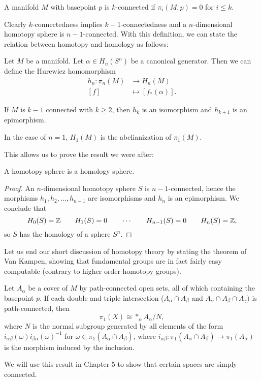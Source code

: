\begin{definition}[$k$-connected]
    A manifold $M$ with basepoint $p$ is $k$-connected if  $\pi_i(M, p) = 0$ for  $i \le  k$.
\end{definition}
Clearly $k$-connectedness implies  $k-1$-connectedness and a $n$-dimensional homotopy sphere is $n-1$-connected.
With this definition, we can state the relation between homotopy and homology as follows:
\begin{theorem}
    Let $M$ be a manifold.
    Let $\alpha \in H_n(S^{n})$ be a canonical generator.
    Then we can define the Hurewicz homomorphism
    \begin{align*}
        h_n: \pi_n(M) &\longrightarrow H_n(M) \\
        [f] &\longmapsto [f_*(\alpha)]
    .\end{align*}

    If $M$ is  $k-1$ connected with  $k\ge 2$, then $h_k$ is an isomorphism and $h_{k+1}$ is an epimorphism.
\end{theorem}
\begin{remark}
    In the case of $n=1$, $H_1(M)$ is the abelianization of $\pi_1(M)$.
\end{remark}
This allows us to prove the result we were after:
\begin{prop}
    A homotopy sphere is a homology sphere.
\end{prop}
\begin{proof}
    An $n$-dimensional homotopy sphere $S$ is $n-1$-connected, hence the morphisms $h_1, h_2, \ldots, h_{n-1}$ are isomorphisms and $h_n$ is an epimorphism.
    We conclude that 
    \[
        H_0(S) = \mathbb{Z} \qquad
        H_1(S) = 0 \qquad 
        \cdots \qquad
        H_{n-1}(S) = 0 \qquad 
        H_{n}(S) = \mathbb{Z}
    ,\] 
    so $S$ has the homology of a sphere  $S^{n}$.
\end{proof}

Let us end our short discussion of homotopy theory by stating the theorem of Van Kampen, showing that fundamental groups are in fact fairly easy computable (contrary to higher order homotopy groups).
\begin{theorem}
    Let $A_\alpha$ be a cover of $M$ by path-connected open sets, all of which containing the basepoint $p$.
    If each double and triple intersection ($A_\alpha \cap A_\beta$ and $A_\alpha \cap A_\beta \cap A_\gamma)$ is path-connected, then
    \[
        \pi_1(X) \cong *_{\alpha} A_\alpha / N
    ,\] 
    where $N$ is the normal subgroup generated by all elements of the form  $i_{\alpha \beta}(\omega) i_{\beta \alpha}(\omega)^{-1}$ for $\omega \in \pi_1(A_\alpha \cap A_\beta)$, where $i_{\alpha\beta}: \pi_1(A_\alpha \cap A_\beta) \to  \pi_1(A_\alpha)$ is the morphism induced by the inclusion.
\end{theorem}

We will use this result in Chapter 5 to show that certain spaces are simply connected.
